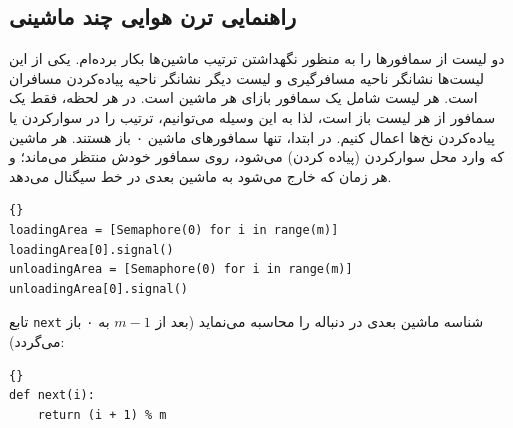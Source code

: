 \documentclass{book}
\newcommand{\clearemptydoublepage}{\newpage\cleardoublepage}
\begin{document}
\clearemptydoublepage
\subsection{راهنمایی ترن هوایی چند ماشینی}

    دو لیست از سمافورها را به منظور نگهداشتن ترتیب ماشین‌ها بکار برده‌ام. یکی از این لیست‌ها نشانگر ناحیه مسافرگیری و لیست دیگر 
    نشانگر ناحیه پیاده‌کردن مسافران است. هر لیست شامل یک سمافور بازای هر ماشین است. در هر لحظه، فقط یک سمافور از هر لیست باز است، 
    لذا به این وسیله می‌توانیم، ترتیب را در سوارکردن یا پیاده‌کردن نخ‌ها اعمال کنیم. در ابتدا، تنها سمافورهای ماشین ۰ باز هستند. 
    هر ماشین که وارد محل سوارکردن (پیاده کردن) می‌شود،‌ روی سمافور خودش منتظر می‌ماند؛ و هر زمان که خارج می‌شود به ماشین 
    بعدی در خط سیگنال می‌دهد. 

\begin{latin}
\begin{lstlisting}[title=\rl{راهنمایی ترن هوایی چند ماشینی}]{}
loadingArea = [Semaphore(0) for i in range(m)]
loadingArea[0].signal()
unloadingArea = [Semaphore(0) for i in range(m)]
unloadingArea[0].signal()
\end{lstlisting}
\end{latin}

    تابع {\tt next}  شناسه ماشین بعدی در دنباله را محاسبه می‌نماید (بعد از $m-1$ به ۰ باز می‌گردد):

\begin{latin}
\begin{lstlisting}[title=\rl{پیاده‌سازی  {\tt next}}]{}
def next(i):
    return (i + 1) % m
\end{lstlisting}
\end{latin}
\end{document}
